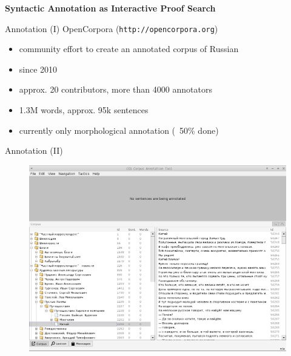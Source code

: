 \documentclass{beamer}
\begin{document}
\begin{frame}{}
\begin{center}
	\textbf{Syntactic Annotation as Interactive Proof Search}
\end{center}
\end{frame}

\begin{frame}{Annotation (I)}
OpenCorpora (\texttt{http://opencorpora.org})\\
\bigskip
\begin{itemize}
    \item community effort to create an annotated corpus of Russian
    \item since 2010
    \item approx. 20 contributors, more than 4000 annotators
    \item 1.3M words, approx. 95k sentences
    \item currently only morphological annotation (~50\% done)
\end{itemize}
\end{frame}

\begin{frame}{Annotation (II)}
\begin{center}
	\begin{figure}[H]
		\includegraphics[scale=0.285]{annotation1.png} 
	\end{figure}
\end{center}
\end{frame}
\end{document}
